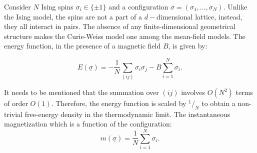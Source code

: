 \documentclass[letterpaper,english,10pt]{article}
\begin{document}
Consider $N$ Ising spins $\sigma_{i}\in \{\pm 1\}$ and a configuration $\sigma = (\sigma_{1},\hdots,\sigma_{N})$. Unlike the Ising model, the spins are not a part of a $d-$dimensional lattice, instead, they all interact in pairs. The absence of any finite-dimensional geometrical structure makes the Curie-Weiss model one among the mean-field models. The energy function, in the presence of a magnetic field $B$, is given by:

$$E(\underline{\sigma}) = -\frac{1}{N}\sum_{(ij)}\sigma_{i}\sigma_{j}-B\sum_{i=1}^{N}\sigma_{i}.$$ 

It needs to be mentioned that the summation over $(ij)$ involves $O(N^{2})$ terms of order $O(1)$. Therefore, the energy function is scaled by $^1/_N$ to obtain a non-trivial free-energy density in the thermodynamic limit. The instantaneous magnetization which is a function of the configuration:
$$m(\underline{\sigma}) = \frac{1}{N}\sum_{i=1}^{N}\sigma_{i}.$$
\end{document}
